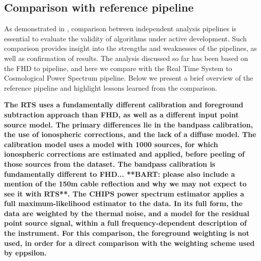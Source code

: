 \documentclass[iop]{emulateapj}
\begin{document}
\subsection{Comparison with reference pipeline}\label{subsec:ref_pipe}

As demonstrated in \citealt{Jacobs:2016}, comparison between independent 
analysis pipelines is essential to evaluate the validity of algorithms under active development. 
Such comparison provides insight into the strengths and weaknesses of the pipelines, as well 
as confirmation of results. The analysis discussed so far has been based on the FHD to 
\eppsilon pipeline, and here we compare with the Real Time System \citep[RTS,][]
{Mitchell:2008,Ord:2010} to Cosmological  Power Spectrum \citep[CHIPS,][]
{Trott:2016} pipeline. Below we present a brief overview of the reference pipeline and 
highlight lessons learned from the comparison.

\textbf{The RTS uses a fundamentally different calibration and foreground subtraction approach than FHD, as well as a different input point source model. The primary differences lie in the bandpass calibration, the use of ionospheric corrections, and the lack of a diffuse model. The calibration model uses a model with 1000 sources, for which ionospheric corrections are estimated and applied, before peeling of those sources from the dataset. The bandpass calibration is fundamentally different to FHD... **BART: please also include a mention of the 150m cable reflection and why we may not expect to see it with RTS**. The CHIPS power spectrum estimator applies a full maximum-likelihood estimator to the data. In its full form, the data are weighted by the thermal noise, and a model for the residual point source signal, within a full frequency-dependent description of the instrument. For this comparison, the foreground weighting is not used, in order for a direct comparison with the weighting scheme used by eppsilon.}
\end{document}
